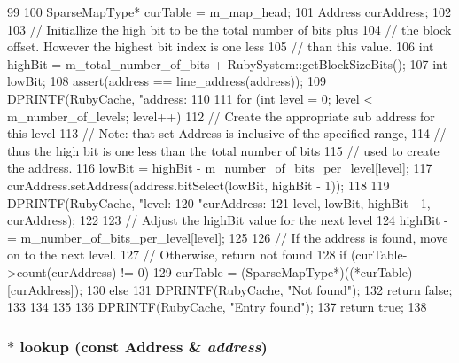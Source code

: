 \begin{DoxyCode}
99 {
100     SparseMapType* curTable = m_map_head;
101     Address curAddress;
102 
103     // Initiallize the high bit to be the total number of bits plus
104     // the block offset.  However the highest bit index is one less
105     // than this value.
106     int highBit = m_total_number_of_bits + RubySystem::getBlockSizeBits();
107     int lowBit;
108     assert(address == line_address(address));
109     DPRINTF(RubyCache, "address: %
110 
111     for (int level = 0; level < m_number_of_levels; level++) {
112         // Create the appropriate sub address for this level
113         // Note: that set Address is inclusive of the specified range,
114         // thus the high bit is one less than the total number of bits
115         // used to create the address.
116         lowBit = highBit - m_number_of_bits_per_level[level];
117         curAddress.setAddress(address.bitSelect(lowBit, highBit - 1));
118 
119         DPRINTF(RubyCache, "level: %
120                 "curAddress: %
121                 level, lowBit, highBit - 1, curAddress);
122 
123         // Adjust the highBit value for the next level
124         highBit -= m_number_of_bits_per_level[level];
125 
126         // If the address is found, move on to the next level.
127         // Otherwise, return not found
128         if (curTable->count(curAddress) != 0) {
129             curTable = (SparseMapType*)((*curTable)[curAddress]);
130         } else {
131             DPRINTF(RubyCache, "Not found\n");
132             return false;
133         }
134     }
135 
136     DPRINTF(RubyCache, "Entry found\n");
137     return true;
138 }
\end{DoxyCode}
\hypertarget{classSparseMemory_a4cc0abbaa49ab392d18c2f34d87afeb2}{
\subsubsection[{lookup}]{ $\ast$ lookup (const {\bf Address} \& {\em address})}}
\label{classSparseMemory_a4cc0abbaa49ab392d18c2f34d87afeb2}



